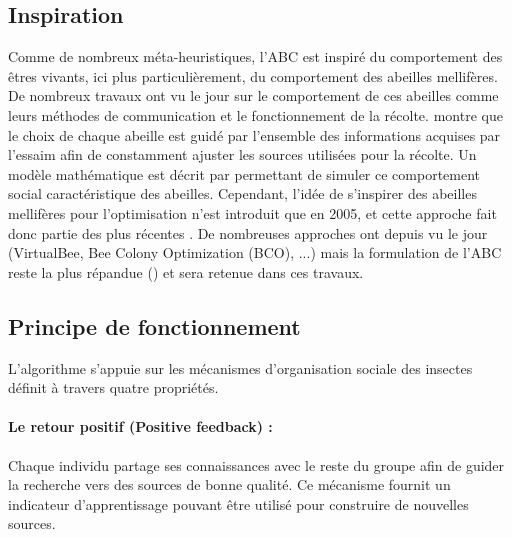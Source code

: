 \subsection{Inspiration} %
\label{sub:inspiration}
Comme de nombreux méta-heuristiques, l’ABC est inspiré du comportement des êtres
vivants, ici plus particulièrement, du comportement des abeilles mellifères. De
nombreux travaux ont vu le jour sur le comportement de ces abeilles comme leurs méthodes
de communication et le fonctionnement de la récolte. \cite{Visscher19821790} montre
que le choix de chaque abeille est guidé par l’ensemble des informations acquises
par l’essaim afin de constamment ajuster les sources utilisées pour la récolte.
Un modèle mathématique est décrit par \cite{Camazine1991547} permettant de simuler
ce comportement social caractéristique des abeilles.
Cependant, l’idée de s’inspirer des abeilles mellifères pour l’optimisation n’est
introduit que en 2005, et cette approche fait donc partie des plus récentes
\parencite{Karaboga2005}. De nombreuses approches ont depuis vu le jour (VirtualBee, Bee
Colony Optimization (BCO), ...) mais la formulation de l’ABC reste la plus répandue
(\parencite{Karaboga201221}) et sera retenue dans ces travaux.



\subsection{Principe de fonctionnement} %
\label{sub:principe_de_fonctionnement}
L’algorithme s’appuie sur les mécanismes d’organisation sociale des insectes \parencite{Bonabeau1999}
définit à travers quatre propriétés.

\paragraph{Le retour positif (Positive feedback) :} %
\label{par:positive_feedback}
Chaque individu partage ses connaissances avec le reste du groupe afin de guider
la recherche vers des sources de bonne qualité. Ce mécanisme fournit un indicateur
d’apprentissage pouvant être utilisé pour construire de nouvelles sources.

